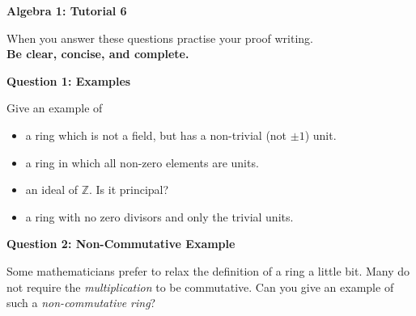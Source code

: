 \documentclass[11pt,twoside, a4paper]{report}
\theoremstyle{plain}
\theoremstyle{definition}
\begin{document}
\begin{center}
 \noindent\makebox[\linewidth]{\rule{14cm}{1.5pt}} 
{\bf Algebra 1: Tutorial 6 }
 \noindent\makebox[\linewidth]{\rule{14cm}{1.5pt}}  
 \noindent\makebox[\linewidth]{\rule{14cm}{3pt}}
\end{center}

\noindent When you answer these questions practise your proof writing.\\
  {\bf Be clear, concise, and complete.}
  
  



  
\begin{center}
{\bf Question 1: Examples}
\end{center}

Give an example of 
\begin{itemize} 

\item a ring which is not a field, but has a non-trivial (not $\pm 1$) unit.
\item a ring in which all non-zero elements are units. 
\item an ideal of $\mathbb{Z}$. Is it principal?
\item a ring with no zero divisors and only the trivial units.
\end{itemize}
  
\begin{center}
{\bf Question 2: Non-Commutative Example}
\end{center}

Some mathematicians prefer to relax the definition of a ring a little bit. Many do not require the \emph{multiplication} to be commutative. Can you give an example of such a \emph{non-commutative ring}?
  
\end{document}
